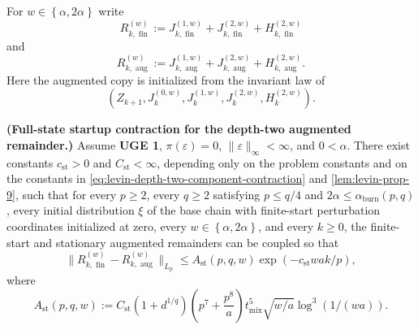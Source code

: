 For $w \in \left\{ \alpha, 2 \alpha \right\}$ write
\[
R_{k, \operatorname{fin}}^{(w)}
  := J_{k, \operatorname{fin}}^{(1,w)}
     + J_{k, \operatorname{fin}}^{(2,w)}
     + H_{k, \operatorname{fin}}^{(2,w)}
\]
and
\[
R_{k, \operatorname{aug}}^{(w)}
  := J_{k, \operatorname{aug}}^{(1,w)}
     + J_{k, \operatorname{aug}}^{(2,w)}
     + H_{k, \operatorname{aug}}^{(2,w)}.
\]
Here the augmented copy is initialized from the invariant law of
\[
  (Z_{k+1},J_k^{(0,w)},J_k^{(1,w)},J_k^{(2,w)},H_k^{(2,w)}).
\]

\begin{lemma}\label{lem:burn-full-startup}
  \textbf{(Full-state startup contraction for the depth-two augmented remainder.)}
  Assume \textbf{UGE 1}, $\pi(\varepsilon)=0$, $\lVert \varepsilon \rVert_{\infty} < \infty$,
  and $0 < \alpha$. There exist constants
  $c_{\mathrm{st}} > 0$ and $C_{\mathrm{st}} < \infty$, depending only on the problem
  constants and on the constants in \eqref{eq:levin-depth-two-component-contraction}
  and \cref{lem:levin-prop-9}, such that for every $p \ge 2$, every
  $q \ge 2$ satisfying $p \le q / 4$ and
  $2 \alpha \le \alpha_{\mathrm{burn}}(p,q)$, every initial distribution $\xi$ of the
  base chain with finite-start perturbation coordinates initialized at zero,
  every $w \in \left\{ \alpha, 2 \alpha \right\}$, and every $k \ge 0$, the finite-start and
  stationary augmented remainders can be coupled so that
  \begin{equation}
\lVert R_{k, \operatorname{fin}}^{(w)} - R_{k, \operatorname{aug}}^{(w)} \rVert_{L_{p}}
    \le A_{\mathrm{st}}(p,q,w) \exp\left(-c_{\mathrm{st}} w a k / p\right),
\label{eq:burn-startup-pointwise}
\end{equation}
  where
  \[
A_{\mathrm{st}}(p,q,w)
    := C_{\mathrm{st}} (1 + d^{1 / q})
       \left( p^{7} + \frac{p^{8}}{a} \right)
       t_{\mathrm{mix}}^{5} \sqrt{w / a}
       \log^{3}(1 / (w a)).
\]
\end{lemma}

